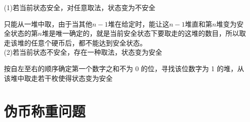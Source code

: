 \documentclass[12pt, a4paper, oneside]{ctexbook}
\begin{document}
\noindent(1)若当前状态安全，对任意取法，状态变为不安全

    只能从一堆中取，由于当其他$n-1$堆在给定时，能让这$n-1$堆直和第$n$堆变为安全状态的第$n$堆是唯一确定的，就是当前安全状态下要取走的这堆的数目，所以取走该堆的任意个硬币后，都不能达到安全状态。\\
(2)若当前状态不安全，存在一种取法，状态变为安全

    按自左至右的顺序确定第一个数字之和不为 0 的位，寻找该位数字为 1 的堆，从该堆中取走若干枚使得状态变为安全
\section{伪币称重问题}
\end{document}
